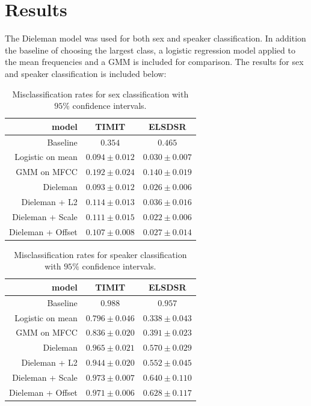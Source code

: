 \section{Results}

The Dieleman model was used for both sex and speaker classification. In addition the baseline of choosing the largest class, a logistic regression model applied to the mean frequencies and a GMM is included for comparison. The results for sex and speaker classification is included below:
\begin{table}[H]
\centering
\begin{tabular}{r|c|c}
model & TIMIT & ELSDSR \\ \hline
                    Baseline & $0.354$ & $0.465$ \\
                    Logistic on mean & $0.094 \pm 0.012$ & $0.030 \pm 0.007$ \\
                 GMM on MFCC & $0.192 \pm 0.024$ & $0.140 \pm 0.019$ \\
                    Dieleman & $0.093 \pm 0.012$ & $0.026 \pm 0.006$ \\
     Dieleman + L2 & $0.114 \pm 0.013$ & $0.036 \pm 0.016$ \\
  Dieleman + Scale & $0.111 \pm 0.015$ & $0.022 \pm 0.006$ \\
 Dieleman + Offset & $0.107 \pm 0.008$ & $0.027 \pm 0.014$ \\
\end{tabular}
\caption{Misclassification rates for sex classification with $95\%$ confidence intervals.}
\label{tab:results-sex}
\end{table}

\begin{table}[H]
\centering
\begin{tabular}{r|c|c}
model & TIMIT & ELSDSR \\ \hline
                    Baseline & $0.988$ & $0.957$ \\
                    Logistic on mean & $0.796 \pm 0.046$ & $0.338 \pm 0.043$ \\
                 GMM on MFCC & $0.836 \pm 0.020$ & $0.391 \pm 0.023$ \\
                    Dieleman & $0.965 \pm 0.021$ & $0.570 \pm 0.029$ \\
     Dieleman + L2 & $0.944 \pm 0.020$ & $0.552 \pm 0.045$ \\
  Dieleman + Scale & $0.973 \pm 0.007$ & $0.640 \pm 0.110$ \\
 Dieleman + Offset & $0.971 \pm 0.006$ & $0.628 \pm 0.117$ \\
\end{tabular}
\caption{Misclassification rates for speaker classification with $95\%$ confidence intervals.}
\label{tab:results-speaker}
\end{table}

